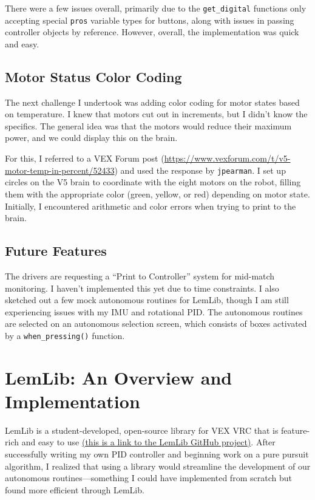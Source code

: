 There were a few issues overall, primarily due to the \texttt{get\_digital} functions only accepting special \texttt{pros} variable types for buttons, along with issues in passing controller objects by reference. However, overall, the implementation was quick and easy.

\subsection*{Motor Status Color Coding}
The next challenge I undertook was adding color coding for motor states based on temperature. I knew that motors cut out in increments, but I didn’t know the specifics. The general idea was that the motors would reduce their maximum power, and we could display this on the brain. 

For this, I referred to a VEX Forum post (\href{https://www.vexforum.com/t/v5-motor-temp-in-percent/52433}{https://www.vexforum.com/t/v5-motor-temp-in-percent/52433}) and used the response by \texttt{jpearman}. I set up circles on the V5 brain to coordinate with the eight motors on the robot, filling them with the appropriate color (green, yellow, or red) depending on motor state. Initially, I encountered arithmetic and color errors when trying to print to the brain.

\subsection*{Future Features}
The drivers are requesting a “Print to Controller” system for mid-match monitoring. I haven't implemented this yet due to time constraints. I also sketched out a few mock autonomous routines for LemLib, though I am still experiencing issues with my IMU and rotational PID. The autonomous routines are selected on an autonomous selection screen, which consists of boxes activated by a \texttt{when\_pressing()} function.

\section*{LemLib: An Overview and Implementation}  

LemLib is a student-developed, open-source library for VEX VRC that is feature-rich and easy to use \href{https://github.com/LemLib/LemLib}{(this is a link to the LemLib GitHub project)}. After successfully writing my own PID controller and beginning work on a pure pursuit algorithm, I realized that using a library would streamline the development of our autonomous routines—something I could have implemented from scratch but found more efficient through LemLib.  

